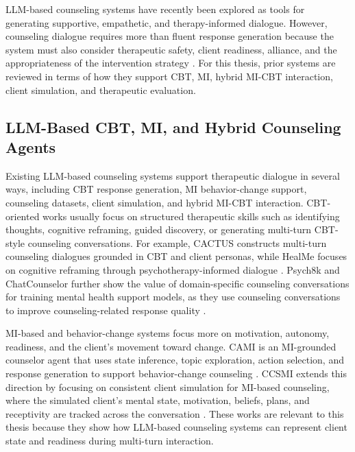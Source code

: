 LLM-based counseling systems have recently been explored as tools for generating supportive, empathetic, and therapy-informed dialogue. However, counseling dialogue requires more than fluent response generation because the system must also consider therapeutic safety, client readiness, alliance, and the appropriateness of the intervention strategy \cite{hua2025scopingreview,nguyen2025llmcounseling}. For this thesis, prior systems are reviewed in terms of how they support CBT, MI, hybrid MI-CBT interaction, client simulation, and therapeutic evaluation.

\subsection{LLM-Based CBT, MI, and Hybrid Counseling Agents}

Existing LLM-based counseling systems support therapeutic dialogue in several ways, including CBT response generation, MI behavior-change support, counseling datasets, client simulation, and hybrid MI-CBT interaction. CBT-oriented works usually focus on structured therapeutic skills such as identifying thoughts, cognitive reframing, guided discovery, or generating multi-turn CBT-style counseling conversations. For example, CACTUS constructs multi-turn counseling dialogues grounded in CBT and client personas, while HealMe focuses on cognitive reframing through psychotherapy-informed dialogue \cite{lee2024cactus,xiao2024healme}. Psych8k and ChatCounselor further show the value of domain-specific counseling conversations for training mental health support models, as they use counseling conversations to improve counseling-related response quality \cite{liu2023chatcounselor}.

MI-based and behavior-change systems focus more on motivation, autonomy, readiness, and the client's movement toward change. CAMI is an MI-grounded counselor agent that uses state inference, topic exploration, action selection, and response generation to support behavior-change counseling \cite{yang2025cami}. CCSMI extends this direction by focusing on consistent client simulation for MI-based counseling, where the simulated client's mental state, motivation, beliefs, plans, and receptivity are tracked across the conversation \cite{yang2025consistent}. These works are relevant to this thesis because they show how LLM-based counseling systems can represent client state and readiness during multi-turn interaction.

